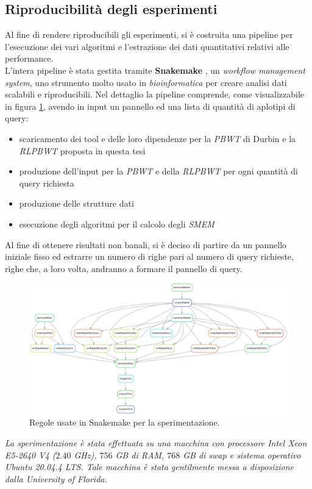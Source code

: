 \subsection{Riproducibilità degli esperimenti}
Al fine di rendere riproducibili gli esperimenti, si è costruita una pipeline
per l'esecuzione dei vari algoritmi e l'estrazione dei dati quantitativi
relativi alle performance.\\
L'intera pipeline è stata gestita tramite \textbf{Snakemake} \cite{snakemake},
un \textit{workflow management system}, uno strumento molto usato in
\textit{bioinformatica} per creare analisi dati scalabili e riproducibili. Nel
dettaglio la pipeline comprende, come visualizzabile in figura \ref{fig:snake},
avendo in input un pannello ed una lista di 
quantità di aplotipi di query:
\begin{itemize}
  \item scaricamento dei tool e delle loro dipendenze per la \textit{PBWT} di
  Durbin e la \textit{RLPBWT} proposta in questa tesi
  \item produzione dell'input per la \textit{PBWT} e della \textit{RLPBWT} per
  ogni quantità di query richiesta
  \item produzione delle strutture dati
  \item esecuzione degli algoritmi per il calcolo degli \textit{SMEM}
\end{itemize}
Al fine di ottenere risultati non banali, si è deciso di partire da
un pannello iniziale fisso ed estrarre un numero di righe pari al numero di
query richieste, righe che, a loro volta, andranno a formare il pannello di
query.\\
\begin{figure}
  \centering
  \includegraphics[width=\textwidth]{img/rules.pdf}
  \caption{Regole usate in Snakemake per la sperimentazione.}
  \label{fig:snake}
\end{figure}
\newline
\textit{La sperimentazione è stata effettuata su una macchina con processore
  Intel Xeon E5-2640 V4 ($2.40$ GHz), $756$ GB di RAM, $768$ GB di swap e
  sistema operativo Ubuntu 20.04.4 LTS. Tale macchina è stata gentilmente messa
  a disposizione dalla \emph{University of Florida}.}